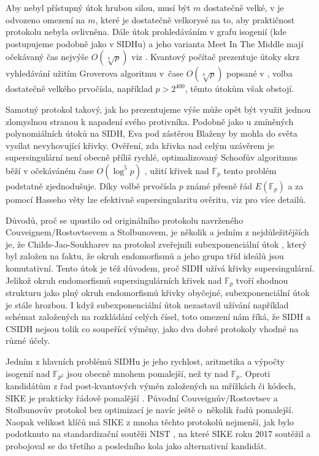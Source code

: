 \documentclass[12pt]{report}
\begin{document}
Aby nebyl přístupný útok hrubou silou, musí být $m$ dostatečně velké, v \cite[Sec. 7.1]{CSIDH} je odvozeno omezení na $m$, které je dostatečně velkorysé na to, aby praktičnost protokolu nebyla ovlivněna. Dále útok prohledáváním v grafu isogenií (kde postupujeme podobně jako v SIDHu) a jeho varianta Meet In The Middle mají očekávaný čas nejvýše $O(\sqrt[4]{p})$ viz \cite{Delfs}. Kvantový počítač prezentuje útoky skrz vyhledávání užitím Groverova algoritmu v~čase $O(\sqrt[6]{p})$ popsané v \cite{DeFeo3}, volba dostatečně velkého prvočísla, například $p > 2^{400}$, těmto útokům však obstojí.

Samotný protokol takový, jak ho prezentujeme výše může opět být využit jednou zlomyslnou stranou k napadení svého protivníka. Podobně jako u zmíněných polynomiálních útoků na SIDH, Eva pod zástěrou Blaženy by mohla do světa vysílat nevyhovující křivky. Ověření, zda křivka nad celým uzávěrem je supersingulární není obecně příliš rychlé, optimalizovaný Schoofův algoritmus běží v očekáváném čase $O(\log ^ 5 p )$ \cite{Sutherland3}, užití křivek nad $\mathbb{F}_p$ tento problém podstatně zjednodušuje. Díky volbě prvočísla $p$ známé přesně řád $E(\mathbb{F}_p)$ a za pomocí Hasseho věty lze efektivně supersingularitu ověritu, viz \cite[Alg. 1. a Sec. 8]{CSIDH} pro více detailů.

Důvodů, proč se upustilo od originálního protokolu navrženého Couveignem/Rostovtsevem a Stolbunovem, je několik a jedním z nejdůležitějších je, že Childs-Jao-Soukharev na protokol zveřejnili subexponenciální útok \cite{Childs}, který byl založen na faktu, že okruh endomorfismů a jeho grupa tříd ideálů jsou komutativní. Tento útok je též důvodem, proč SIDH užívá křivky supersingulární. Jelikož okruh endomorfismů supersingulárních křivek nad $\mathbb{F}_p$ tvoří shodnou strukturu jako plný okruh endomorfismů křivky obyčejné, subexponenciální útok je stále hrozbou. I když subexponenciální útok nezastavil užívání například schémat založených na rozkládání celých čísel, toto omezení nám říká, že SIDH a CSIDH nejsou tolik co soupeřící výměny, jako dva dobré protokoly vhodné na různé účely. 

Jedním z hlavních problémů SIDHu je jeho rychlost, aritmetika a výpočty isogenií nad $\mathbb{F}_{p^2}$ jsou obecně mnohem pomalejší, než ty nad $\mathbb{F}_p$. Oproti kandidátům z řad post-kvantových výměn založených na mřížkách či kódech, SIKE je prakticky řádově pomalější \cite[Ch. 6]{SIKE}. Původní Couveignův/Rostovtsev a Stolbunovův protokol bez optimizací je navíc ještě o~několik řadů pomalejší. Naopak velikost klíčů má SIKE z mnoha těchto protokolů nejmenší, jak bylo podotknuto na standardizační soutěži NIST \cite{NIST}, na které SIKE roku 2017 soutěžil a probojoval se do třetího a posledního kola jako alternativní kandidát.
\end{document}
